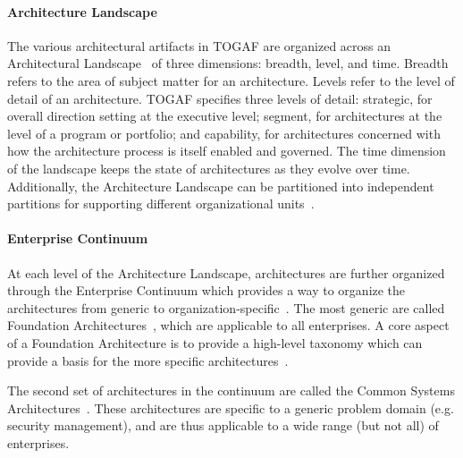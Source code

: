 \paragraph*{Architecture Landscape}
The various architectural artifacts in TOGAF are organized across an Architectural Landscape~\cite[Ch. 20]{togaf9.1} of three dimensions: breadth, level, and time. Breadth refers to the area of subject matter for an architecture. Levels refer to the level of detail of an architecture. TOGAF specifies three levels of detail: strategic, for overall direction setting at the executive level; segment, for architectures at the level of a program or portfolio; and capability, for architectures concerned with how the architecture process is itself enabled and governed. The time dimension of the landscape keeps the state of architectures as they evolve over time. Additionally, the Architecture Landscape can be partitioned into independent partitions for supporting different organizational units~\cite[Ch. 40]{togaf9.1}. 



\paragraph*{Enterprise Continuum}
At each level of the Architecture Landscape, architectures are further organized through the Enterprise Continuum which provides a way to organize the architectures from generic to organization-specific~\cite[Ch. 39]{togaf9.1}. The most generic are called Foundation Architectures~\cite[Ch. 39.4.1]{togaf9.1}, which are applicable to all enterprises. A core aspect of a Foundation Architecture is to provide a high-level taxonomy which can provide a basis for the more specific architectures~\cite[Ch. 43]{togaf9.1}. 

The second set of architectures in the continuum are called the Common Systems Architectures~\cite[Ch. 39.4.1]{togaf9.1}. These architectures are specific to a generic problem domain (e.g. security management), and are thus applicable to a wide range (but not all) of enterprises.

